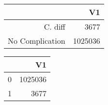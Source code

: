 \bigskip\bigskip
\centering
\begin{tabular}{rr}
  \hline
 & V1 \\ 
  \hline
C. diff & 3677 \\ 
  No Complication & 1025036 \\ 
   \hline
\end{tabular}

\bigskip\bigskip
\centering
\begin{tabular}{rr}
  \hline
 & V1 \\ 
  \hline
0 & 1025036 \\ 
  1 & 3677 \\ 
   \hline
\end{tabular}

